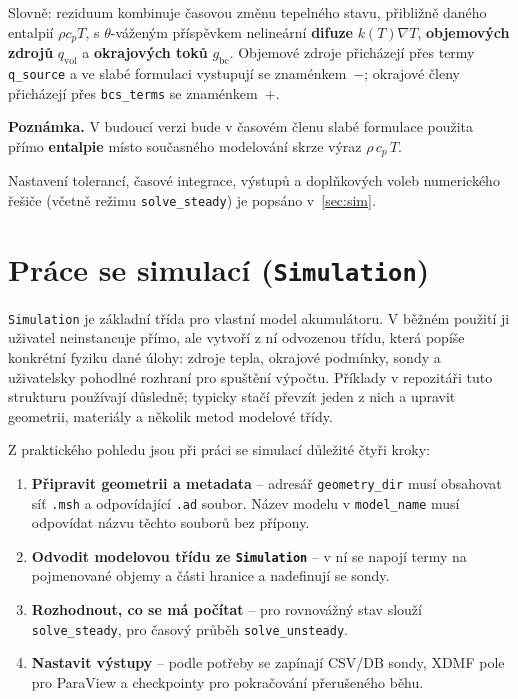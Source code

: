 \documentclass[a4paper,11pt]{article}
\begin{document}
Slovně: reziduum kombinuje časovou změnu tepelného stavu, přibližně daného
entalpií \(\rho c_p T\), s \(\theta\)-váženým příspěvkem nelineární
\textbf{difuze} \(k(T)\nabla T\), \textbf{objemových zdrojů}
\(q_{\mathrm{vol}}\) a \textbf{okrajových toků} \(g_{\mathrm{bc}}\). Objemové
zdroje přicházejí přes termy \texttt{q\_source} a ve slabé formulaci vystupují
se znaménkem~\(-\); okrajové členy přicházejí přes \texttt{bcs\_terms}
se znaménkem~\(+\).

\begin{noteblock}
\textbf{Poznámka.}
V budoucí verzi bude v časovém členu slabé formulace použita přímo
\textbf{entalpie} místo současného modelování skrze výraz \(\rho\,c_p\,T\).
\end{noteblock}

Nastavení tolerancí, časové integrace, výstupů a doplňkových voleb numerického
řešiče (včetně režimu \texttt{solve\_steady}) je popsáno v~\autoref{sec:sim}.

\section{Práce se simulací (\texttt{Simulation})}\label{sec:sim}

\texttt{Simulation} je základní třída pro vlastní model akumulátoru. V běžném
použití ji uživatel neinstancuje přímo, ale vytvoří z ní odvozenou třídu, která
popíše konkrétní fyziku dané úlohy: zdroje tepla, okrajové podmínky, sondy a
uživatelsky pohodlné rozhraní pro spuštění výpočtu. Příklady v repozitáři tuto
strukturu používají důsledně; typicky stačí převzít jeden z nich a upravit
geometrii, materiály a několik metod modelové třídy.

Z praktického pohledu jsou při práci se simulací důležité čtyři kroky:

\begin{enumerate}
  \item \textbf{Připravit geometrii a metadata} -- adresář \texttt{geometry\_dir}
        musí obsahovat síť \texttt{.msh} a odpovídající \texttt{.ad} soubor.
        Název modelu v \texttt{model\_name} musí odpovídat názvu těchto souborů
        bez přípony.
  \item \textbf{Odvodit modelovou třídu ze \texttt{Simulation}} -- v ní se
        napojí termy na pojmenované objemy a části hranice a nadefinují se sondy.
  \item \textbf{Rozhodnout, co se má počítat} -- pro rovnovážný stav slouží
        \texttt{solve\_steady}, pro časový průběh \texttt{solve\_unsteady}.
  \item \textbf{Nastavit výstupy} -- podle potřeby se zapínají CSV/DB sondy,
        XDMF pole pro ParaView a checkpointy pro pokračování přerušeného běhu.
\end{enumerate}
\end{document}

